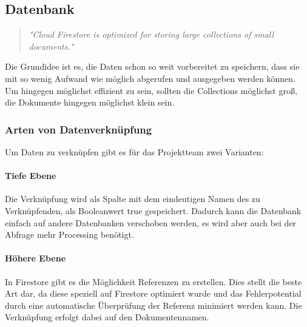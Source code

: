 \subsection{Datenbank}

\begin{quote}
  \textit{
    "Cloud Firestore is optimized for storing large collections of small documents."}
\end{quote}

Die Grundidee ist es, die Daten schon so weit vorbereitet zu speichern, dass sie mit so wenig Aufwand wie möglich abgerufen und ausgegeben werden können. Um hingegen möglichst effizient zu sein, sollten die Collections möglichst groß, die Dokumente hingegen möglichst klein sein.

\subsubsection{Arten von Datenverknüpfung}

Um Daten zu verknüpfen gibt es für das Projektteam zwei Varianten:

\paragraph{Tiefe Ebene}
Die Verknüpfung wird als Spalte mit dem eindeutigen Namen des zu Verknüpfenden, als Booleanwert true gespeichert.  Dadurch kann die Datenbank einfach auf andere Datenbanken verschoben werden, es wird aber auch bei der Abfrage mehr Processing benötigt.

\paragraph{Höhere Ebene}
In Firestore gibt es die Möglichkeit Referenzen zu erstellen. Dies stellt die beste Art dar, da diese speziell auf Firestore optimiert wurde und das Fehlerpotential durch eine automatische Überprüfung der Referenz minimiert werden kann. Die Verknüpfung erfolgt dabei auf den Dokumentennamen.
